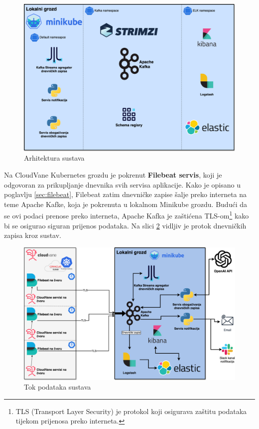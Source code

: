 \documentclass[times, utf8, diplomski]{fer}
\begin{document}
\begin{figure}[htb]
	\centering
	\includegraphics[width=15cm]{images/ThesisArchitecture.png}
	\caption[Arhitektura sustava]{Arhitektura sustava}
	\label{fig:archDiagram}
\end{figure}

Na CloudVane Kubernetes grozdu je pokrenut \textbf{Filebeat servis}, koji je odgovoran za prikupljanje dnevnika svih servisa aplikacije. Kako je opisano u poglavlju \ref{sec:filebeat}, Filebeat zatim dnevničke zapise šalje preko interneta na teme Apache Kafke, koja je pokrenuta u lokalnom Minikube grozdu. Budući da se ovi podaci prenose preko interneta, Apache Kafka je zaštićena TLS-om\footnote{TLS (Transport Layer Security) je protokol koji osigurava zaštitu podataka tijekom prijenosa preko interneta.} kako bi se osigurao siguran prijenos podataka. Na slici \ref{fig:dataDiagram} vidljiv je protok dnevničkih zapisa kroz sustav.

\begin{figure}[htb]
	\centering
	\includegraphics[width=15cm]{images/ThesisData.png}
	\caption[Tok podataka sustava]{Tok podataka  sustava}
	\label{fig:dataDiagram}
\end{figure}
\end{document}
